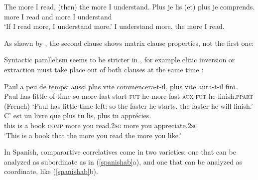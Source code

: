 { \begin{exe}
 \ex
\begin{xlista}
\ex The more I read, (then) the more I understand.
\ex 
\gll Plus je lis (et) plus je comprends.\\
     more I read and more I understand\\
\glt `If I read more, I understand more.'
\ex I understand more, the more I read.
\end{xlista}\label{adjcc}
\end{exe}

As shown by \citet[549--550]{culijack}, the second clause shows matrix clause properties, not the first one:

\begin{exe}
 \ex
\begin{xlista}
\end{xlista}
\end{exe}

Syntactic parallelism seems to be stricter in , for example clitic inversion or extraction
must take place out of both clauses at the same time \citep[]{Abeille:Borsley:08}:

\begin{exe}
 \ex
\begin{xlista}
\ex 
\gll Paul a     peu  de temps: aussi plus  vite commencera-t-il,  plus   vite  aura-t-il  fini.\\
     Paul has little of time so more fast start-\textsc{fut}-he more fast  \textsc{aux}-\textsc{fut}-he finish.\textsc{ppart} \\\hfill{(French)}
\glt `Paul has little time left: so the faster he starts, the faster he will finish.'
\ex \gll C'   est un livre  que      plus   tu    lis, plus  tu    appr\'{e}cies. \\
this is    a  book \textsc{comp} more you read.2\textsc{sg}  more you appreciate.2\textsc{sg} \\
\glt `This is a book that the more you read the more you like.'
\end{xlista}
\end{exe}

In Spanish, comparartive correlatives come in two varieties: one that can be analyzed as subordinate
as in (\ref{spanishab}a), 
 and one that can be analyzed as coordinate, like  (\ref{spanishab}b).

}
